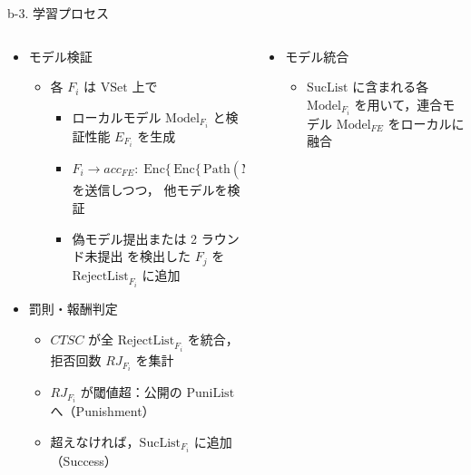 \documentclass[unicode,12pt,aspectratio=169, dvipdfmx]{beamer}
\begin{document}
\begin{frame}{b-3. 学習プロセス}
    \begin{columns}
        \begin{column}[T]{.7\linewidth}
            \begin{itemize}
                \item[a.] モデル検証
                  \begin{itemize}
                    \item 各 $F_i$ は $\mathrm{VSet}$ 上で
                      \begin{itemize}
                        \item ローカルモデル $\mathrm{Model}_{F_i}$ と検証性能 $E_{F_i}$ を生成
                        \item 
                          $F_i \to acc_{FE}:\;
                          \mathrm{Enc}\{\,
                            \mathrm{Enc}\{\,
                              \mathrm{Path}(\mathrm{Model}_{F_i}),\,E_{F_i},\,acc_{F_i}
                            \}_{k_{\text{Active}}}
                          \}_{pk_{FE}}$
                          を送信しつつ， 他モデルを検証
                        \item 偽モデル提出または 2 ラウンド未提出 を検出した $F_j$ を $\mathrm{RejectList}_{F_i}$ に追加
                      \end{itemize}
                  \end{itemize}
                \item[b.] 罰則・報酬判定
                  \begin{itemize}
                    \item $CTSC$ が全 $\mathrm{RejectList}_{F_i}$ を統合，拒否回数 $RJ_{F_i}$ を集計
                    \item $RJ_{F_i}$ が閾値超：公開の $\mathrm{PuniList}$ へ（Punishment）
                    \item 超えなければ，$\mathrm{SucList}_{F_i}$ に追加（Success）
                  \end{itemize}
            \end{itemize}
        \end{column}
        \begin{column}[T]{.4\linewidth}
            \begin{itemize}
                \item[c.] モデル統合
                \begin{itemize}
                \item $\mathrm{SucList}$ に含まれる各 $\mathrm{Model}_{F_i}$ を用いて，連合モデル $\mathrm{Model}_{FE}$ をローカルに融合
                \end{itemize}
            \end{itemize}
        \end{column}
    \end{columns}
\end{frame}
\end{document}

